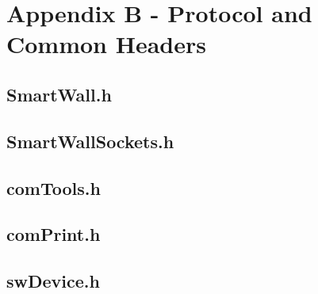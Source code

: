 \documentclass[12pt]{article}
\begin{document}


\pagebreak

\section{Appendix B - Protocol and Common Headers}
\label{sec:AppendixB}

\pagebreak

\subsection{SmartWall.h}
\label{sec:AppendixB.SmartWall.h}


\pagebreak

\subsection{SmartWallSockets.h}
\label{sec:AppendixB.SmartWallSockets.h}


\pagebreak

\subsection{comTools.h}
\label{sec:AppendixB.comTools.h}


\pagebreak

\subsection{comPrint.h}
\label{sec:AppendixB.comPrint.h}


\pagebreak

\subsection{swDevice.h}
\label{sec:AppendixB.swDevice.h}

\end{document}
